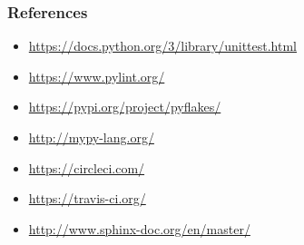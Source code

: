 \documentclass[9pt]{beamer}
\begin{document}
\begin{frame}
  \frametitle{References}
  \scriptsize
  \begin{itemize}
  \item \url{https://docs.python.org/3/library/unittest.html}
  \item \url{https://www.pylint.org/}
  \item \url{https://pypi.org/project/pyflakes/}
  \item \url{http://mypy-lang.org/}
  \item \url{https://circleci.com/}
  \item \url{https://travis-ci.org/}
  \item \url{http://www.sphinx-doc.org/en/master/}
  \end{itemize}
\end{frame}
\end{document}
